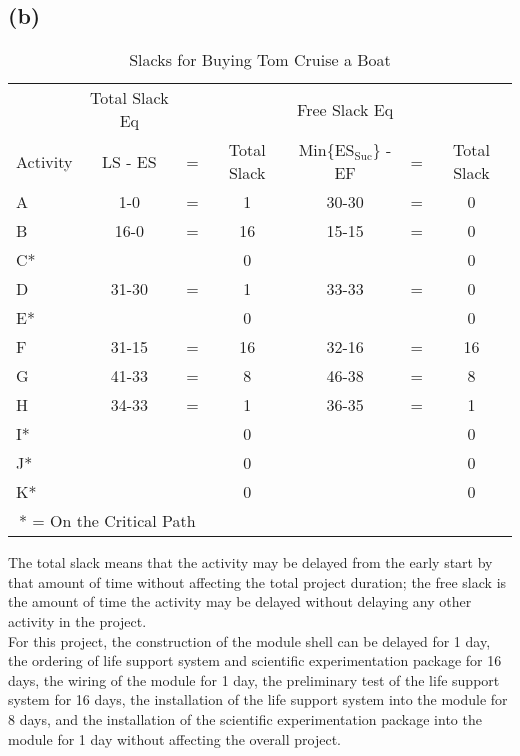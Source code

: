 \documentclass{article}
\begin{document}
	\subsection*{(b)}
		{\renewcommand{\arraystretch}{1.2} 
	\begin{table}[h!tbp]
  		\begin{center}
    		\caption{Slacks for Buying Tom Cruise a Boat}
    		\label{tab:table2}
			
    		\begin{tabular}{lcccccc}
				 & Total Slack Eq &  &  & Free Slack Eq & &\\
				Activity & LS - ES & = & Total Slack & Min\{ES$_{\text{Suc}}$\} - EF &= & Total Slack \\
				\hline
      			A  & 1-0   & = & 1  & 30-30 & = & 0 \\
      			B  & 16-0  & = & 16 & 15-15 & = & 0 \\
				C* &       &   & 0  &       &   & 0 \\
				D  & 31-30 & = & 1  & 33-33 & = & 0 \\
				E* &       &   & 0  &       &   & 0 \\
				F  & 31-15 & = & 16 & 32-16 & = & 16\\
				G  & 41-33 & = & 8  & 46-38 & = & 8 \\
				H  & 34-33 & = & 1  & 36-35 & = & 1 \\
				I* &       &   & 0  &       &   & 0 \\
				J* &       &   & 0  &       &   & 0 \\
				K* &       &   & 0  &       &   & 0 \\
				\hline
				\multicolumn{3}{c}{* = On the Critical Path}\\
    		\end{tabular}
  		\end{center}
	\end{table}
	}
	\noindent The total slack means that the activity may be delayed from the early start by that amount of time without affecting the total project duration; the free slack is the amount of time the activity may be delayed without delaying any other activity in the project.\\
	For this project, the construction of the module shell can be delayed for 1 day, the ordering of life support system and scientific experimentation package for 16 days, the wiring of the module for 1 day, the preliminary test of the life support system for 16 days, the installation of the life support system into the module for 8 days, and the installation of the scientific experimentation package into the module for 1 day without affecting the overall project.\\
\end{document}
